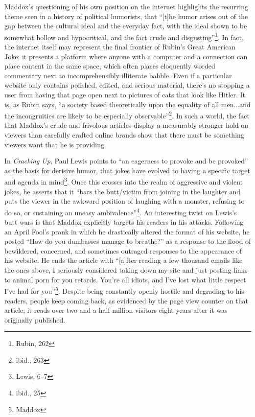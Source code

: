 Maddox's questioning of his own position on the internet highlights the
recurring theme seen in a history of political humorists, that ``[t]he humor
arises out of the gap between the cultural ideal and the everyday fact, with the
ideal shown to be somewhat hollow and hypocritical, and the fact crude and
disgusting''\footnote{Rubin, 262}. In fact, the internet itself may represent
the final frontier of Rubin's Great American Joke; it presents a platform where
anyone with a computer and a connection can place content in the same space,
which often places eloquently worded commentary next to incomprehensibly
illiterate babble. Even if a particular website only contains polished, edited,
and serious material, there's no stopping a user from having that page open next
to pictures of cats that look like Hitler. It is, as Rubin says, ``a society
based theoretically upon the equality of all men...and the incongruities are
likely to be especially observable''\footnote{ibid., 263}. In such a world, the fact
that Maddox's crude and frivolous articles display a measurably stronger hold on
viewers than carefully crafted online brands show that there must be something
viewers want that he is providing.

In \textit{Cracking Up}, Paul Lewis points to ``an eagerness to provoke and be
provoked'' as the basis for derisive humor, that jokes have evolved to having a
specific target and agenda in mind\footnote{Lewis, 6--7}. Once this crosses into
the realm of aggressive and violent jokes, he asserts that it ``bars the
butt/victim from joining in the laughter and puts the viewer in the awkward
position of laughing with a monster, refusing to do so, or sustaining an uneasy
ambivalence''\footnote{ibid., 25}. An interesting twist on Lewis's butt wars is that
Maddox explicitly targets his readers in his attacks. Following an April Fool's
prank in which he drastically altered the format of his website, he posted ``How
do you dumbasses  manage to breathe?'' as a response to the flood of bewildered,
concerned, and sometimes outraged responses to the appearance of his website. He
ends the article with ``[a]fter reading a few thousand emails like the ones
above, I seriously considered taking down my site and just posting links to
animal porn for you retards. You're all idiots, and I've lost what little
respect I've had for you''\footnote{Maddox}. Despite being constantly openly
hostile and degrading to his readers, people keep coming back, as evidenced by
the page view counter on that article; it reads over two and a half million
visitors eight years after it was originally published.

